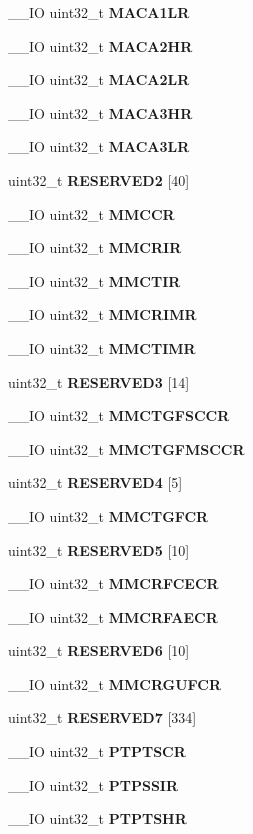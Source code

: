 \begin{DoxyCompactItemize}
\+\_\+\+\_\+\+IO uint32\+\_\+t \textbf{ M\+A\+C\+A1\+LR}
\item 
\+\_\+\+\_\+\+IO uint32\+\_\+t \textbf{ M\+A\+C\+A2\+HR}
\item 
\+\_\+\+\_\+\+IO uint32\+\_\+t \textbf{ M\+A\+C\+A2\+LR}
\item 
\+\_\+\+\_\+\+IO uint32\+\_\+t \textbf{ M\+A\+C\+A3\+HR}
\item 
\+\_\+\+\_\+\+IO uint32\+\_\+t \textbf{ M\+A\+C\+A3\+LR}
\item 
uint32\+\_\+t \textbf{ R\+E\+S\+E\+R\+V\+E\+D2} [40]
\item 
\+\_\+\+\_\+\+IO uint32\+\_\+t \textbf{ M\+M\+C\+CR}
\item 
\+\_\+\+\_\+\+IO uint32\+\_\+t \textbf{ M\+M\+C\+R\+IR}
\item 
\+\_\+\+\_\+\+IO uint32\+\_\+t \textbf{ M\+M\+C\+T\+IR}
\item 
\+\_\+\+\_\+\+IO uint32\+\_\+t \textbf{ M\+M\+C\+R\+I\+MR}
\item 
\+\_\+\+\_\+\+IO uint32\+\_\+t \textbf{ M\+M\+C\+T\+I\+MR}
\item 
uint32\+\_\+t \textbf{ R\+E\+S\+E\+R\+V\+E\+D3} [14]
\item 
\+\_\+\+\_\+\+IO uint32\+\_\+t \textbf{ M\+M\+C\+T\+G\+F\+S\+C\+CR}
\item 
\+\_\+\+\_\+\+IO uint32\+\_\+t \textbf{ M\+M\+C\+T\+G\+F\+M\+S\+C\+CR}
\item 
uint32\+\_\+t \textbf{ R\+E\+S\+E\+R\+V\+E\+D4} [5]
\item 
\+\_\+\+\_\+\+IO uint32\+\_\+t \textbf{ M\+M\+C\+T\+G\+F\+CR}
\item 
uint32\+\_\+t \textbf{ R\+E\+S\+E\+R\+V\+E\+D5} [10]
\item 
\+\_\+\+\_\+\+IO uint32\+\_\+t \textbf{ M\+M\+C\+R\+F\+C\+E\+CR}
\item 
\+\_\+\+\_\+\+IO uint32\+\_\+t \textbf{ M\+M\+C\+R\+F\+A\+E\+CR}
\item 
uint32\+\_\+t \textbf{ R\+E\+S\+E\+R\+V\+E\+D6} [10]
\item 
\+\_\+\+\_\+\+IO uint32\+\_\+t \textbf{ M\+M\+C\+R\+G\+U\+F\+CR}
\item 
uint32\+\_\+t \textbf{ R\+E\+S\+E\+R\+V\+E\+D7} [334]
\item 
\+\_\+\+\_\+\+IO uint32\+\_\+t \textbf{ P\+T\+P\+T\+S\+CR}
\item 
\+\_\+\+\_\+\+IO uint32\+\_\+t \textbf{ P\+T\+P\+S\+S\+IR}
\item 
\+\_\+\+\_\+\+IO uint32\+\_\+t \textbf{ P\+T\+P\+T\+S\+HR}
\item 

\end{DoxyCompactItemize}
